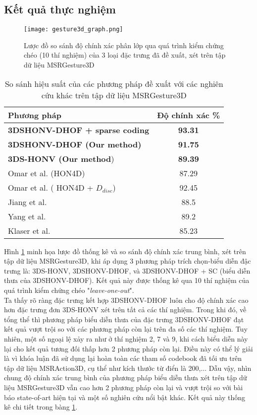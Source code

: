 \subsection{Kết quả thực nghiệm}
\begin{figure}
\centering
\texttt{[image: gesture3d\_graph.png]}
\caption{Lược đồ so sánh độ chính xác phân lớp qua quá trình kiểm chứng chéo (10 thí nghiệm) của 3 loại đặc trưng đã đề xuất, xét trên tập dữ liệu MSRGesture3D}
\label{fig_gesture3d_graph}
\end{figure}

\begin{table}
	\caption{So sánh hiệu suất của các phương pháp đề xuất với các nghiên cứu khác trên tập dữ liệu MSRGesture3D}
	\centering 
	\begin{tabular}{l c}	
	\hline\hline
	\textbf{Phương pháp} & \textbf{Độ chính xác \%} \\	
	\hline\hline
	\textbf{3DSHONV-DHOF + sparse coding} & \textbf{93.31}\\ 
	\textbf{3DSHONV-DHOF (Our method)} &  \textbf{91.75}\\ 
	\textbf{3DS-HONV (Our method}) & \textbf{89.39}\\
	\hline \hline
	Omar et al. \cite{Omar_HON4D} (HON4D) & 87.29\\
	Omar et al. \cite{Omar_HON4D} (	HON4D + \(D_{disc}\))	&  92.45 \\
	Jiang et al. \cite{Wu_LOP2012} & 88.5 \\
	Yang et al. \cite{WangLCCW12_ROP} & 89.2 \\
	Klaser et al. \cite{Klaser_HOG3D} & 85.23 \\
	\hline
	\end{tabular}	
	\label{table_gesture3d}
\end{table}

Hình \ref{fig_gesture3d_graph} minh họa lược đồ thống kê và so sánh độ chính xác trung bình, xét trên tập dữ liệu MSRGesture3D, khi áp dụng 3 phương pháp trích chọn-biểu diễn đậc trưng là: 3DS-HONV, 3DSHONV-DHOF, và 3DSHONV-DHOF + SC (biểu diễn thưa của 3DSHONV-DHOF). Kết quả này được thống kê qua 10 thí nghiệm của quá trình kiểm chứng chéo "\textit{leave-one-out}". \\
Ta thấy rõ ràng đặc trưng kết hợp 3DSHONV-DHOF luôn cho độ chính xác cao hơn đặc trưng đơn 3DS-HONV xét trên tất cả các thí nghiệm. Trong khi đó, về tổng thể thì phương pháp biểu diễn thưa của đặc trưng 3DSHONV-DHOF đạt kết quả vượt trội so với các phương pháp còn lại trên đa số các thí nghiệm. Tuy nhiên, một số ngoại lệ xảy ra như ở thí nghiệm 2, 7 và 9, khi cách biểu diễn này lại cho kết quả tương đối thấp hơn 2 phương pháp còn lại. Điều này có thể lý giải là vì khóa luận đã sử dụng lại hoàn toàn các tham số codebook đã tối ưu trên tập dữ liệu MSRAction3D, cụ thể như kích thước từ điển là 200,... Dẫu vậy, nhìn chung độ chính xác trung bình của phương pháp biểu diễn thưa xét trên tập dữ liệu MSRGesture3D vẫn cao hơn 2 phương pháp còn lại và vượt trội so với bài báo state-of-art hiện tại \cite{Omar_HON4D} và một số nghiên cứu nổi bật khác. Kết quả này thống kê chi tiết trong bàng \ref{table_gesture3d}. 

